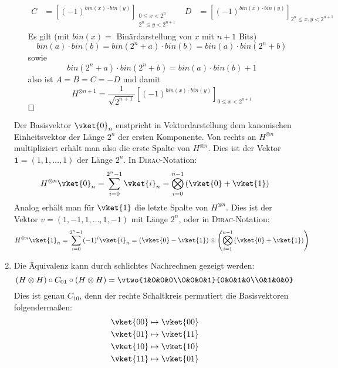 \begin{enumerate}
\begin{itemize}
\begin{align*}
                C &= \left[(-1)^{bin(x)\cdot bin(y)}\right]_{\substack{0   \leq x < 2^n \\
                                                                              2^n \leq y < 2^{n+1}}} &
                D &= \left[(-1)^{bin(x)\cdot bin(y)}\right]_{2^n \leq x,y < 2^{n+1}}
                \end{align*}
                Es gilt (mit $bin(x) = $ Binärdarstellung von $x$ mit $n+1$ Bits)
                \[ bin(a)\cdot bin(b) = bin(2^n + a)\cdot bin(b) = bin(a)\cdot bin(2^n + b) \]
                sowie
                \[ bin(2^n + a)\cdot bin(2^n + b) = bin(a)\cdot bin(b) + 1 \]
                also ist $A = B = C = -D$ und damit
                \[ H^{\otimes n+1} = \frac{1}{\sqrt{2^{n+1}}} \left[(-1)^{bin(x)\cdot bin(y)}\right]_{0 \leq x < 2^{n+1}} \]$\hfill\square$
        \end{itemize}
        Der Basisvektor $\vket{0}_n$ enstpricht in Vektordarstellung dem
        kanonischen Einheitsvektor der Länge $2^n$ der ersten Komponente. Von rechts an
        $H^{\otimes n}$ multipliziert erhält man also die erste Spalte von $H^{\otimes n}$.
        Dies ist der Vektor $\mathbf{1} = (1, 1, \dots, 1)$ der Länge $2^n$. In \textsc{Dirac}-Notation:
        \[ H^{\otimes n} \vket{0}_n = \sum_{i=0}^{2^n-1} \vket{i}_n = \bigotimes_{i=0}^{n-1} \left(\vket{0} + \vket{1}\right) \]
        Analog erhält man für $\vket{1}$ die letzte Spalte von $H^{\otimes n}$. Dies ist der Vektor
        $v = (1, -1, 1, \dots, 1, -1)$ mit Länge $2^n$, oder in \textsc{Dirac}-Notation:
        \[ H^{\otimes n} \vket{1}_n = \sum_{i=0}^{2^n-1} (-1)^i\vket{i}_n = (\vket{0} - \vket{1}) \otimes \left(\bigotimes_{i=1}^{n-1} \left(\vket{0} + \vket{1}\right)\right) \]
\item Die Äquivalenz kann durch schlichtes Nachrechnen gezeigt werden:
        \[ (H \otimes H) \circ C_{01} \circ (H \otimes H) = \vtwo{1&0&0&0\\0&0&0&1}{0&0&1&0\\0&1&0&0} \]
       Dies ist genau $C_{10}$, denn der rechte Schaltkreis permutiert die
       Basisvektoren folgendermaßen:
       \begin{eqnarray*}
               \vket{00} \mapsto \vket{00} \\
               \vket{01} \mapsto \vket{11} \\
               \vket{10} \mapsto \vket{10} \\
               \vket{11} \mapsto \vket{01}
       \end{eqnarray*}
\end{enumerate}
